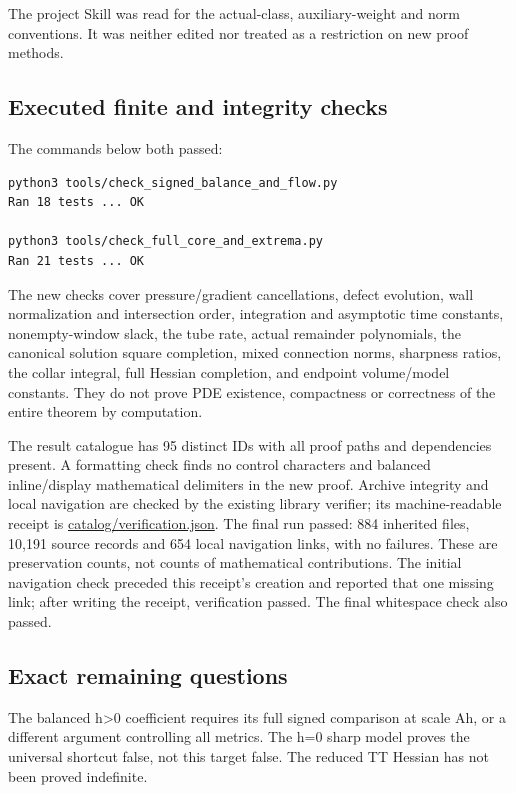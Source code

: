 \documentclass[
  10pt,
]{article}
\begin{document}
The project Skill was read for the actual-class, auxiliary-weight and
norm conventions. It was neither edited nor treated as a restriction on
new proof methods.

\hypertarget{executed-finite-and-integrity-checks}{%
\subsection{Executed finite and integrity
checks}\label{executed-finite-and-integrity-checks}}

The commands below both passed:

\begin{verbatim}
python3 tools/check_signed_balance_and_flow.py
Ran 18 tests ... OK

python3 tools/check_full_core_and_extrema.py
Ran 21 tests ... OK
\end{verbatim}

The new checks cover pressure/gradient cancellations, defect evolution,
wall normalization and intersection order, integration and asymptotic
time constants, nonempty-window slack, the tube rate, actual remainder
polynomials, the canonical solution square completion, mixed connection
norms, sharpness ratios, the collar integral, full Hessian completion,
and endpoint volume/model constants. They do not prove PDE existence,
compactness or correctness of the entire theorem by computation.

The result catalogue has 95 distinct IDs with all proof paths and
dependencies present. A formatting check finds no control characters and
balanced inline/display mathematical delimiters in the new proof.
Archive integrity and local navigation are checked by the existing
library verifier; its machine-readable receipt is
\href{../catalog/verification.json}{catalog/verification.json}. The
final run passed: 884 inherited files, 10,191 source records and 654
local navigation links, with no failures. These are preservation counts,
not counts of mathematical contributions. The initial navigation check
preceded this receipt's creation and reported that one missing link;
after writing the receipt, verification passed. The final whitespace
check also passed.

\hypertarget{exact-remaining-questions}{%
\subsection{Exact remaining questions}\label{exact-remaining-questions}}

The balanced h\textgreater0 coefficient requires its full signed
comparison at scale Ah, or a different argument controlling all metrics.
The h=0 sharp model proves the universal shortcut false, not this target
false. The reduced TT Hessian has not been proved indefinite.
\end{document}

